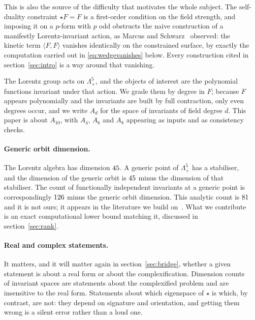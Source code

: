 \documentclass[11pt,a4paper]{article}
\theoremstyle{definition}
\theoremstyle{remark}
\begin{document}
This is also the source of the difficulty that motivates the whole subject. The
self-duality constraint $\star F = F$ is a first-order condition on the field
strength, and imposing it on a $p$-form with $p$ odd obstructs the naive
construction of a manifestly Lorentz-invariant action, as Marcus and
Schwarz~\cite{Marcus:1982yu} observed: the kinetic term
$\langle F,F\rangle$ vanishes identically on the constrained surface, by exactly
the computation carried out in \eqref{eq:wedgevanishes} below. Every construction
cited in section~\ref{sec:intro} is a way around that vanishing.

The Lorentz group acts on $\Lambda^5_+$, and the objects of interest are the
polynomial functions invariant under that action. We grade them by degree in
$F$; because $F$ appears polynomially and the invariants are built by full
contraction, only even degrees occur, and we write $A_d$ for the space of
invariants of field degree $d$. This paper is about $A_{10}$, with $A_4$, $A_6$
and $A_8$ appearing as inputs and as consistency checks.

\paragraph{Generic orbit dimension.}
The Lorentz algebra has dimension $45$. A generic point of
$\Lambda^5_+$ has a stabiliser, and the dimension of the generic orbit is
$45$ minus the dimension of that stabiliser. The count of
functionally independent invariants at a generic point is correspondingly
$126$ minus the generic orbit dimension. This analytic count is
$81$ and it is not ours; it appears in the literature we build
on~\cite{Hutomo:2025chiral}. What we contribute is an exact computational lower
bound matching it, discussed in section~\ref{sec:rank}.

\paragraph{Real and complex statements.}
It matters, and it will matter again in section~\ref{sec:bridge}, whether a given
statement is about a real form or about the complexification. Dimension counts of
invariant spaces are statements about the complexified problem and are insensitive
to the real form. Statements about which eigenspace of $\star$ is which, by
contrast, are not: they depend on signature and orientation, and getting them
wrong is a silent error rather than a loud one.
\end{document}
